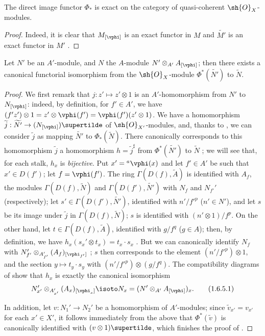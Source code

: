 \begin{corollary}[1.6.4]
\label{I.1.6.4}
The direct image functor $\Phi_*$ is exact on the category of quasi-coherent $\sh{O}_X$-modules.
\end{corollary}

\begin{proof}
Indeed, it is clear that $M_{[\vphi]}$ is an exact functor in $M$ and $\widetilde{M'}$ is an
exact functor in $M'$ .
\end{proof}

\begin{proposition}[1.6.5]
\label{I.1.6.5}
Let $N'$ be an $A'$-module, and $N$ the $A$-module $N'\otimes_{A'}A_{[\vphi]}$;
then there exists a canonical functorial isomorphism from the $\sh{O}_X$-module $\Phi^*(\widetilde{N'})$ to $\widetilde{N}$.
\end{proposition}

\begin{proof}
We first remark that $j:z'\mapsto z'\otimes 1$ is an $A'$-homomorphism from $N'$ to $N_{[\vphi]}$: indeed, by definition, for $f'\in A'$, we have $(f' z')\otimes 1=z'\otimes\vphi(f')=\vphi(f')(z'\otimes 1)$.
We have  a homomorphism $\widetilde{j}:\widetilde{N'}\to(N_{[\vphi]})\supertilde$ of $\sh{O}_{X'}$-modules, and, thanks to , we can consider $\widetilde{j}$ as mapping $\widetilde{N'}$ to $\Phi_*(\widetilde{N})$.
There canonically corresponds to this homomorphism $\widetilde{j}$ a homomorphism $h=\widetilde{j}^\sharp$ from $\Phi^*(\widetilde{N'})$ to $\widetilde{N}$ ;
we will see that, for each stalk, $h_x$ is \emph{bijective}.
Put $x'={}^a\vphi(x)$ and let $f'\in A'$ be such that $x'\in D(f')$;
let $f=\vphi(f')$.
The ring $\Gamma(D(f),\widetilde{A})$ is identified with $A_f$, the modules
$\Gamma(D(f),\widetilde{N})$ and $\Gamma(D(f'),\widetilde{N'})$ with $N_f$ and $N_{f'}'$
(respectively);
let $s'\in\Gamma(D(f'),\widetilde{N'})$, identified with $n'/{f'}^p$ ($n'\in N'$), and let $s$ be its image under $\widetilde{j}$ in $\Gamma(D(f),\widetilde{N})$;
$s$ is identified with $(n'\otimes 1)/f^p$.
On the other hand, let $t\in\Gamma(D(f),\widetilde{A})$, identified with $g/f^q$ ($g\in A$);
then, by definition, we have $h_x(s_x'\otimes t_x)=t_x\cdot s_x$ .
But we can canonically identify $N_f$ with $N_{f'}'\otimes_{A_{f'}'}(A_f)_{[\vphi_{f'}]}$ ;
$s$ then corresponds to the element $(n'/{f'}^p)\otimes 1$, and the section $y\mapsto t_y\cdot s_y$ with $(n'/{f'}^p)\otimes(g/f^q)$.
The compatibility diagrams of  show that $h_x$ is exactly the canonical isomorphism
\[
  \label{I.1.6.5.1}
  N_{x'}'\otimes_{A_{x'}'}(A_x)_{[\vphi_x]}\isoto N_x=(N'\otimes_{A'}A_{[\vphi]})_x.
  \tag{1.6.5.1}
\]

In addition, let $v:N_1'\to N_2'$ be a homomorphism of $A'$-modules;
since $\widetilde{v}_{x'}=v_{x'}$ for each $x'\in X'$, it follows immediately from the above that $\Phi^*(\widetilde{v})$ is canonically identified with $(v\otimes 1)\supertilde$, which finishes the proof of .
\end{proof}


